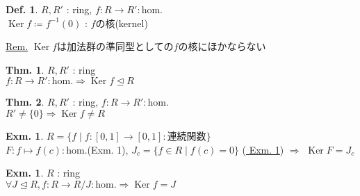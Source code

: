 \documentclass[uplatex,dvipdfmx,9pt]{beamer}
\newcommand{\inverse}[1]{#1^{-1}}
\newcommand{\Ker}{\operatorname{Ker}}
\newcommand{\ideal}{\trianglelefteq}
\renewcommand{\hom}{\text{hom.}} %
\newcounter{textExmCount}
\theoremstyle{definition} %
\newtheorem{defn}{Def.}[subsection] %
\newtheorem{thm}{Thm.}[subsection] %
\theoremstyle{example}
\newtheorem{exmText}[textExmCount]{Exm.}
\begin{document}
\begin{frame}

  \begin{defn}
    $R, R'$ : ring, $f\colon R \to R' : \hom$ \\
    $\Ker f \coloneqq \inverse{f}(0)$ : $f$の\alert{核(kernel)}
  \end{defn}
  \underline{Rem.} $\Ker f$は加法群の準同型としての$f$の核にほかならない

  \begin{thm}
    $R, R'$ : ring \\
    $f\colon R \to R' : \hom \Rightarrow \Ker f \ideal R$
  \end{thm}

  \begin{thm}
    $R, R'$ : ring, $f\colon R \to R' : \hom$ \\
    $R'\neq \{0\} \Rightarrow \Ker f \neq R$
  \end{thm}

\end{frame}

\begin{frame}

  \begin{exmText}
    $R = \{f \mid f\colon [0, 1] \to [0, 1] : \text{連続関数}\}$ \\
    $F\colon f \mapsto f(c) : \hom$(Exm. 1), $J_c = \{f \in R \mid f(c) = 0\}$ (\hyperlink{exmText3-1}{ Exm. 1}) $\Rightarrow$ $\Ker F = J_c$
  \end{exmText}

  \begin{exmText}
    $R$ : ring \\
    $\forall J \ideal R, f\colon R \to R/J : \hom \Rightarrow \Ker f = J$
  \end{exmText}

\end{frame}
\end{document}

